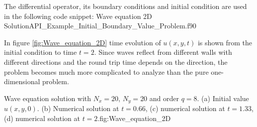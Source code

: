 The differential operator, its boundary conditions and initial condition are used  in the following code snippet:  
\vspace{0.5cm} 
      {Wave equation 2D}
      {Solution}{API_Example_Initial_Boundary_Value_Problem.f90}
        
    
In figure  \ref{fig:Wave_equation_2D}  time evolution of $ u(x,y,t)$ is shown from the initial condition to time $ t= 2 $. 
Since waves reflect from different walls with different directions and the round trip time depends on the direction, the problem becomes much more complicated to analyze than the pure one-dimensional problem. 
  
\fourgraphs
{}
{}
{}
{}
{Wave equation solution  with  $N_x = 20 $, $ N_y =20$ and order $q=8$. (a) Initial value $u(x,y,0)$. (b) Numerical solution at $ t =0.66$, (c) numerical solution at $t = 1.33$, (d) numerical solution at $t = 2.$}{fig:Wave_equation_2D}
  
   
 
 
 
 
 